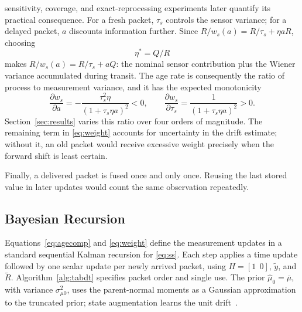 \documentclass[journal]{IEEEtran}
\begin{document}
sensitivity, coverage, and exact-reprocessing experiments later quantify its
practical consequence. For a fresh packet, $\tau_s$ controls the sensor
variance; for a delayed packet, $a$ discounts information further. Since
$R/w_s(a)=R/\tau_s+\eta aR$, choosing
\begin{equation}\label{eq:etastar}
\eta^{*}=Q/R
\end{equation}
makes $R/w_s(a)=R/\tau_s+aQ$: the nominal sensor contribution plus the Wiener
variance accumulated during transit. The age rate is consequently the ratio
of process to measurement variance, and it has the expected monotonicity
\begin{equation}\label{eq:weightderivatives}
\frac{\partial w_s}{\partial a}
=-\frac{\tau_s^2\eta}{(1+\tau_s\eta a)^2}<0,
\qquad
\frac{\partial w_s}{\partial\tau_s}
=\frac{1}{(1+\tau_s\eta a)^2}>0.
\end{equation}
Section~\ref{sec:results} varies this ratio over four orders of magnitude.
The remaining term in \eqref{eq:weight} accounts for uncertainty in the drift
estimate; without it, an old packet would receive excessive weight precisely
when the forward shift is least certain.

Finally, a delivered packet is fused once and only once. Reusing the last
stored value in later updates would count the same observation repeatedly.

\subsection{Bayesian Recursion}
Equations~\eqref{eq:agecomp} and \eqref{eq:weight} define the measurement
updates in a standard sequential Kalman recursion for \eqref{eq:ss}. Each step
applies a time update followed by one scalar update per newly arrived packet,
using $H=[1\;\,0]$, $\tilde y$, and $\tilde R$. Algorithm~\ref{alg:tabdt}
specifies packet order and single use. The prior $\hat\mu_0=\bar\mu$, with
variance $\sigma_{\mu0}^{2}$, uses the parent-normal moments as a Gaussian
approximation to the truncated prior; state augmentation learns the unit
drift~\cite{zhai2017}.
\end{document}
